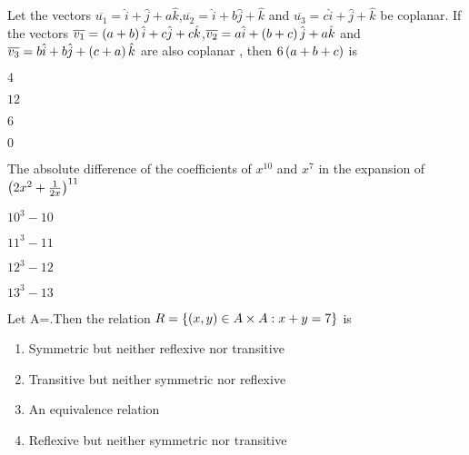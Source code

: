     \item Let the vectors $\overline{u_1}=\hat{i}+\hat{j}+a\hat{k}$,$\overline{u_2}=\hat{i}+b\hat{j}+\hat{k}$ and $\overline{u_3}=c\hat{i}+\hat{j}+\hat{k}$ be coplanar. If the vectors $\overline{v_1}=\left(a+b\right)\hat{i}+c\hat{j}+c\hat{k}$,$\overline{v_2}=a\hat{i}+\left(b+c\right)\hat{j}+a\hat{k}$ and $\overline{v_3}=b\hat{i}+b\hat{j}+\left(c+a\right)\hat{k}$ are also coplanar , then $6\left(a+b+c\right)$ is 
        \hfill{}\\
        \begin{enumerate}    
        \begin{multicols}{4}
                \item $4$
                \item $12$
                \item $6$
                \item $0$
                \end{multicols}
              \end{enumerate}    
    \item The absolute  difference of the coefficients of $x^{10}$ and $x^7$ in the expansion of $\left(2x^2+\frac{1}{2x}\right)^{11}$
        \hfill{}\\
       \begin{enumerate}    
        \begin{multicols}{4}
                \item  $10^3-10$
                \item  $11^3-11$
                \item  $12^3-12$
                \item  $13^3-13$
                \end{multicols}
              \end{enumerate}    


    \item Let A=.Then the relation $R=\left\{\left(x,y\right) \in A\times A :x+y=7\right\}$ is 
        \hfill{}\\
        \begin{enumerate} 
                \item Symmetric but neither reflexive nor transitive
                \item Transitive but neither symmetric nor reflexive
                \item An equivalence relation
                \item Reflexive but neither symmetric nor transitive
              \end{enumerate}    

